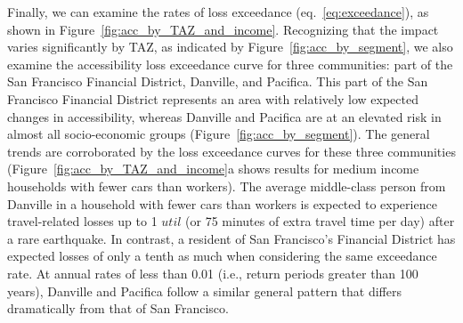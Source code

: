 Finally, we can examine the rates of loss exceedance (eq.~\ref{eq:exceedance}), as shown in Figure~\ref{fig:acc_by_TAZ_and_income}.  %
Recognizing that the impact varies significantly by TAZ, as indicated by Figure~\ref{fig:acc_by_segment},
we also examine the accessibility loss exceedance curve for three communities: part of the San Francisco Financial District, Danville, and Pacifica. This part of the San Francisco Financial District  represents an area with relatively low expected changes in accessibility, whereas Danville and Pacifica are at an elevated risk in almost all socio-economic groups (Figure~\ref{fig:acc_by_segment}). 
The general trends are corroborated by the loss exceedance curves for these three communities (Figure~\ref{fig:acc_by_TAZ_and_income}{a} shows results for medium income households with fewer cars than workers). The average middle-class person from Danville in a household with fewer cars than workers is expected to experience travel-related losses up to 1 $util$ (or 75 minutes of extra travel time per day) after a rare earthquake. In contrast, a resident of San Francisco's Financial District has expected losses of only a tenth as much when considering the same exceedance rate. At annual rates of less than 0.01 (i.e., return periods greater than 100 years), Danville and Pacifica follow a similar general pattern that differs dramatically from that of San Francisco. 

